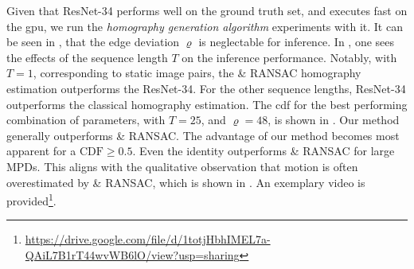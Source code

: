 Given that ResNet-34 performs well on the ground truth set, and executes fast on the \gls{gpu}, we run the \textit{homography generation algorithm} experiments with it. It can be seen in , that the edge deviation $\varrho$ is neglectable for inference. In , one sees the effects of the sequence length $T$ on the inference performance. Notably, with $T=1$, corresponding to static image pairs, the  \& RANSAC homography estimation outperforms the ResNet-34. For the other sequence lengths, ResNet-34 outperforms the classical homography estimation. The \gls{cdf} for the best performing combination of parameters, with $T=25$, and $\varrho=48$, is shown in . Our method generally outperforms  \& RANSAC. The advantage of our method becomes most apparent for a $\text{CDF}\geq0.5$. Even the identity outperforms  \& RANSAC for large MPDs. This aligns with the qualitative observation that motion is often overestimated by  \& RANSAC, which is shown in . An exemplary video is provided\footnote{\url{https://drive.google.com/file/d/1totjHbhIMEL7a-QAiL7B1rT44wvWB6lO/view?usp=sharing}}.







